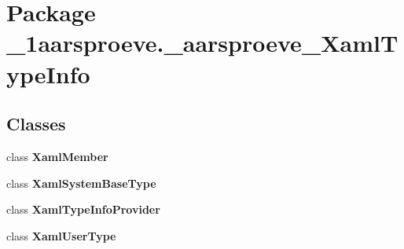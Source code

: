 \hypertarget{namespace__1aarsproeve_1_1__aarsproeve___xaml_type_info}{}\section{Package \+\_\+1aarsproeve.\+\_\+aarsproeve\+\_\+\+Xaml\+Type\+Info}
\label{namespace__1aarsproeve_1_1__aarsproeve___xaml_type_info}
\subsection*{Classes}
\begin{DoxyCompactItemize}
\item 
class {\bfseries Xaml\+Member}
\item 
class {\bfseries Xaml\+System\+Base\+Type}
\item 
class {\bfseries Xaml\+Type\+Info\+Provider}
\item 
class {\bfseries Xaml\+User\+Type}
\end{DoxyCompactItemize}
